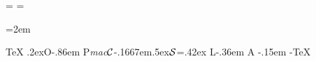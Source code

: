 \newdimen\iindent  \iindent=\parindent
\newdimen\ttindent \ttindent=\parindent

\def\ttskip{\medskip}       %
\mathchardef{}  %
\def\tthook{}               %
\def\intthook{}             %

\def\iiskip{\medskip}     %
\def\bibskip{\smallskip}  %

\def\tabstrut{\strut}     %
\def\tabiteml{\enspace}   %
\def\tabitemr{\enspace}   %
\def\vvkern{1pt}          %
\def\hhkern{1pt}          %

\def\multiskip{\medskip}      %
\newdimen\colsep \colsep=2em  %

\newdimen\mnoteindent \mnoteindent=10pt %
\newdimen\mnotesize   \mnotesize=20mm   %

\def\picdir{}      %
\def\bibtexhook{}  %
\def\chaphook{}    %
\def\sechook{}     %
\def\secchook{}    %
\def\cnvhook{}     %
\def\pghook{}      %
\def\toclinehook{} %
\def\mnotehook{}   %
\def\captionhook#1{} %


\def\OPmac{\leavevmode
   \lower.2ex\hbox{\thefontscale[1400]O}\kern-.86em P{\em mac}}
\def\CS{$\cal C$\kern-.1667em\lower.5ex\hbox{$\cal S$}}
\def\csplain{\CS plain}

\def\LaTeX{\tmpdim=.42ex L\kern-.36em \kern\slantcorr %
  \raise\tmpdim\hbox{\thefontscale[710]A}%
  \kern-.15em \kern-\slantcorr \TeX}
\def\slantcorr{\expandafter\ignorept\the\fontdimen1\the\font\tmpdim}

\addprotect\TeX   \addprotect\OPmac   \addprotect\CS  \addprotect\LaTeX


